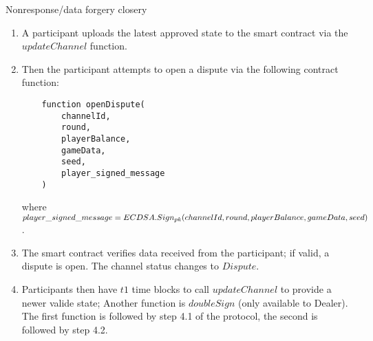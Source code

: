 \begin{algorithm}[H]
\caption{Nonresponse/data forgery closery} \label{alg:close4}
\begin{enumerate}
	\item A participant uploads the latest approved state to the smart contract via the $updateChannel$ function.
	\item Then the participant attempts to open a dispute via the following contract function:
\begin{lstlisting}
    function openDispute(
        channelId,
        round,
        playerBalance,
        gameData,
        seed,
        player_signed_message
    )
\end{lstlisting}
where $player\_signed\_message = ECDSA.Sign_{pk}(channelId, round, \\ playerBalance, gameData, seed)$.
	\item The smart contract verifies data received from the participant; if valid, a dispute is open. The channel status changes to $Dispute$.
	\item  Participants then have $t1$ time blocks to call $updateChannel$ to provide a newer valide state; Another function is  $doubleSign$ (only available to Dealer). The first function is followed by step 4.1 of the protocol, the second is followed by step 4.2.
\end{enumerate}
\end{algorithm}
